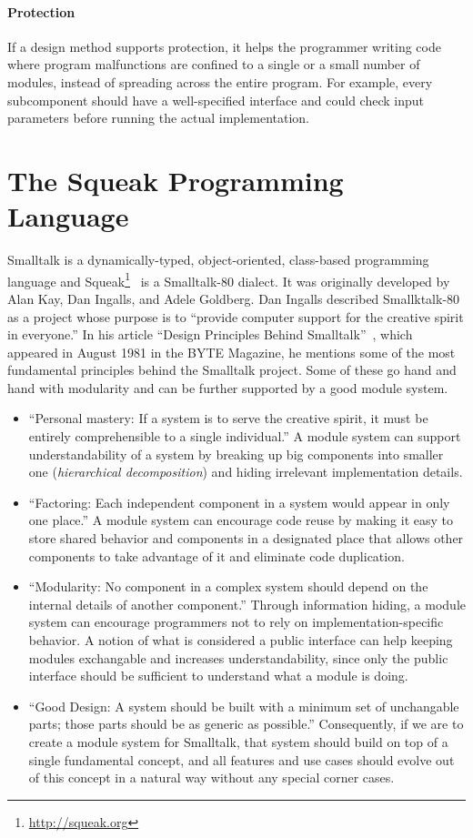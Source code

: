 \paragraph{Protection}
If a design method supports protection, it helps the programmer writing code where program malfunctions are confined to a single or a small number of modules, instead of spreading across the entire program. For example, every subcomponent should have a well-specified interface and could check input parameters before running the actual implementation.

\section{The Squeak Programming Language}
Smalltalk is a dynamically-typed, object-oriented, class-based programming language and Squeak\footnote{\url{http://squeak.org}}~\cite{Ingalls:1997:BFS:263698.263754} is a Smalltalk-80 dialect. It was originally developed by Alan Kay, Dan Ingalls, and Adele Goldberg. Dan Ingalls described Smallktalk-80 as a project whose purpose is to ``provide computer support for the creative spirit in everyone.'' In his article ``Design Principles Behind Smalltalk''~\cite{Inga81a}, which appeared in August 1981 in the BYTE Magazine, he mentions some of the most fundamental principles behind the Smalltalk project. Some of these go hand and hand with modularity and can be further supported by a good module system.

\begin{itemize}
	\item ``Personal mastery: If a system is to serve the creative spirit, it must be entirely comprehensible to a single individual.'' A module system can support understandability of a system by breaking up big components into smaller one (\emph{hierarchical decomposition}) and hiding irrelevant implementation details.
	\item ``Factoring: Each independent component in a system would appear in only one place.'' A module system can encourage code reuse by making it easy to store shared behavior and components in a designated place that allows other components to take advantage of it and eliminate code duplication.
	\item ``Modularity: No component in a complex system should depend on the internal details of another component.'' Through information hiding, a module system can encourage programmers not to rely on implementation-specific behavior. A notion of what is considered a public interface can help keeping modules exchangable and increases understandability, since only the public interface should be sufficient to understand what a module is doing.
	\item ``Good Design: A system should be built with a minimum set of unchangable parts; those parts should be as generic as possible.'' Consequently, if we are to create a module system for Smalltalk, that system should build on top of a single fundamental concept, and all features and use cases should evolve out of this concept in a natural way without any special corner cases.
\end{itemize}

